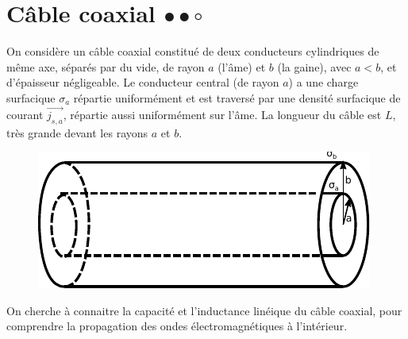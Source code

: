 \documentclass{report}
\begin{document}
\newpage

\section*{Câble coaxial $\bullet\bullet\circ$}

On considère un câble coaxial constitué de deux conducteurs cylindriques de même axe, séparés par du vide, de rayon $a$ (l'âme) et $b$ (la gaine), avec $a<b$, et d'épaisseur négligeable. Le conducteur central (de rayon $a$) a une charge surfacique $\sigma_a$ répartie uniformément et est traversé par une densité surfacique de courant $\vec{j_{s,a}}$, répartie aussi uniformément sur l'âme. La longueur du câble est $L$, très grande devant les rayons $a$ et $b$.  

\begin{figure}[h!]
\centering
		\includegraphics[scale=1]{em2.pdf}
\end{figure}

On cherche à connaitre la capacité et l'inductance linéique du câble coaxial, pour comprendre la propagation des ondes électromagnétiques à l'intérieur. 
\end{document}
